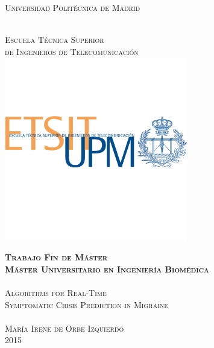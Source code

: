 


\begin{titlepage}
\setlength{\headheight}{0pt}
\setlength{\footskip}{0pt}
\setlength{\topmargin}{0pt}

\begin{center}
\LARGE
\textsc{Universidad Politécnica de Madrid}

	\smallskip

    \hfill
	\\
	\textsc{Escuela Técnica Superior\\ de Ingenieros de Telecomunicación}\\ 


        \includegraphics[width=8cm]{images/etsit}


	\textsc{\textbf{Trabajo Fin de Máster}}\\

    \smallskip
    {\Large \textsc{\textbf{Máster Universitario en Ingeniería Biomédica}}}\\
	
    \bigskip
	\hfill
    \\
    
    \textsc{Algorithms for Real-Time \\ Symptomatic Crisis Prediction in Migraine} \\ %

	\bigskip
    \hfill
    \\

	\textsc{María Irene de Orbe Izquierdo}
	\vspace{0.5cm}
    \hfill
    \\
	\textsc{2015}
        





    \end{center}        
\end{titlepage}   
\thispagestyle{empty}

